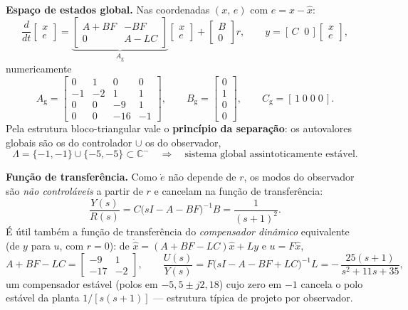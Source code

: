 \documentclass[11pt,a4paper]{article}
\begin{document}
\textbf{Espa\c{c}o de estados global.} Nas coordenadas $(x,\,e)$ com $e=x-\hat x$:
\[
\frac{d}{dt}\!\begin{bmatrix}x\\ e\end{bmatrix}
=\underbrace{\begin{bmatrix}A+BF & -BF\\ 0 & A-LC\end{bmatrix}}_{A_{\mathrm{g}}}
\begin{bmatrix}x\\ e\end{bmatrix}
+\begin{bmatrix}B\\ 0\end{bmatrix}r,
\qquad
y=[\,C\;\;0\,]\begin{bmatrix}x\\ e\end{bmatrix},
\]
numericamente
\[
A_{\mathrm{g}}=
\begin{bmatrix}
0&1&0&0\\
-1&-2&1&1\\
0&0&-9&1\\
0&0&-16&-1
\end{bmatrix},
\qquad
B_{\mathrm{g}}=\begin{bmatrix}0\\1\\0\\0\end{bmatrix},
\qquad
C_{\mathrm{g}}=[\,1\;0\;0\;0\,].
\]
Pela estrutura bloco-triangular vale o \textbf{princ\'ipio da separa\c{c}\~ao}: os
autovalores globais s\~ao os do controlador $\cup$ os do observador,
\[
\Lambda=\{-1,-1\}\cup\{-5,-5\}\subset\mathbb{C}^- \quad\Rightarrow\quad
\text{sistema global assintoticamente est\'avel.}
\]

\textbf{Fun\c{c}\~ao de transfer\^encia.} Como $\dot e$ n\~ao depende de $r$,
os modos do observador s\~ao \emph{n\~ao control\'aveis} a partir de $r$ e cancelam
na fun\c{c}\~ao de transfer\^encia:
\[
\frac{Y(s)}{R(s)}=C\big(sI-A-BF\big)^{-1}B=\frac{1}{(s+1)^2}.
\]
\'E \'util tamb\'em a fun\c{c}\~ao de transfer\^encia do \emph{compensador din\^amico}
equivalente (de $y$ para $u$, com $r=0$): de
$\dot{\hat x}=(A+BF-LC)\hat x+Ly$ e $u=F\hat x$,
\[
A+BF-LC=\begin{bmatrix}-9&1\\-17&-2\end{bmatrix},
\qquad
\frac{U(s)}{Y(s)}=F\big(sI-A-BF+LC\big)^{-1}L
=-\,\frac{25(s+1)}{s^2+11s+35},
\]
um compensador est\'avel (polos em $-5{,}5\pm j2{,}18$) cujo zero em $-1$ cancela o
polo est\'avel da planta $1/[s(s+1)]$ --- estrutura t\'ipica de projeto por observador.
\end{document}
